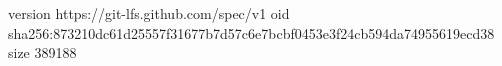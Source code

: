 version https://git-lfs.github.com/spec/v1
oid sha256:873210dc61d25557f31677b7d57c6e7bcbf0453e3f24cb594da74955619ecd38
size 389188
